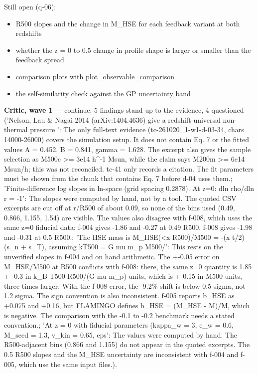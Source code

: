 \documentclass[11pt,a4paper]{article}
\begin{document}
Still open (q-06):

\begin{itemize}
  \item R500 slopes and the change in M\_HSE for each feedback variant at both redshifts
  \item whether the z = 0 to 0.5 change in profile shape is larger or smaller than the feedback spread
  \item comparison plots with plot\_observable\_comparison
  \item the self-similarity check against the GP uncertainty band
\end{itemize}
\textbf{Critic, wave 1} --- continue: 5 findings stand up to the evidence, 4 questioned ('Nelson, Lau \& Nagai 2014 (arXiv:1404.4636) give a redshift-universal non-thermal pressure ': The only full-text evidence (tc-261020\_1-w1-d-03-34, chars 14000-26000) covers the simulation setup. It does not contain Eq. 7 or the fitted values A = 0.452, B = 0.841, gamma = 1.628. The excerpt also gives the sample selection as M500c \textgreater{}= 3e14 h\textasciicircum{}-1 Msun, while the claim says M200m \textgreater{}= 6e14 Msun/h; this was not reconciled. tc-41 only records a citation. The fit parameters must be shown from the chunk that contains Eq. 7 before d-04 uses them.; 'Finite-difference log slopes in ln-space (grid spacing 0.2878). At z=0: dln rho/dln r = -1': The slopes were computed by hand, not by a tool. The quoted CSV excerpts are cut off at r/R500 of about 0.09, so none of the bins used (0.49, 0.866, 1.155, 1.54) are visible. The values also disagree with f-008, which uses the same z=0 fiducial data: f-004 gives -1.86 and -0.27 at 0.49 R500, f-008 gives -1.98 and -0.31 at 0.5 R500.; 'The HSE mass is M\_HSE(\textless{}x R500)/M500 = -(x t/2)(s\_n + s\_T), assuming kT500 = G mu m\_p M500/': This rests on the unverified slopes in f-004 and on hand arithmetic. The +-0.05 error on M\_HSE/M500 at R500 conflicts with f-008: there, the same z=0 quantity is 1.85 +- 0.3 in k\_B T500 R500/(G mu m\_p) units, which is +-0.15 in M500 units, three times larger. With the f-008 error, the -9.2\% shift is below 0.5 sigma, not 1.2 sigma. The sign convention is also inconsistent. f-005 reports b\_HSE as +0.075 and +0.16, but FLAMINGO defines b\_HSE = (M\_HSE - M)/M, which is negative. The comparison with the -0.1 to -0.2 benchmark needs a stated convention.; 'At z = 0 with fiducial parameters (kappa\_w = 3, e\_w = 0.6, M\_seed = 1.3, v\_kin = 0.65, eps': The values were computed by hand. The R500-adjacent bins (0.866 and 1.155) do not appear in the quoted excerpts. The 0.5 R500 slopes and the M\_HSE uncertainty are inconsistent with f-004 and f-005, which use the same input files.).
\end{document}

